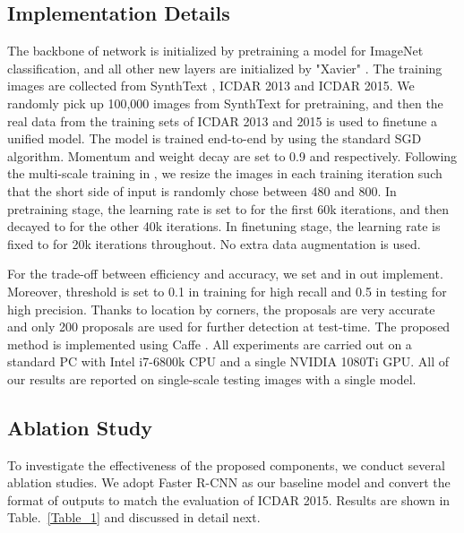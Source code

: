 \documentclass[3p, times]{elsarticle}
\begin{document}
\subsection{Implementation Details}
The backbone of network is initialized by pretraining a model for ImageNet \cite{IMAGENET2015IJCV} classification, and all other new layers are initialized by "Xavier" \cite{XAVIER2010AISTATS}. The training images are collected from SynthText \cite{FCRN2016CVPR}, ICDAR 2013 and ICDAR 2015. We randomly pick up 100,000 images from SynthText for pretraining, and then the real data from the training sets of ICDAR 2013 and 2015 is used to finetune a unified model. The model is trained end-to-end by using the standard SGD algorithm. Momentum and weight decay are set to 0.9 and   respectively. Following the multi-scale training in \cite{PVANET2016ARXIV}, we resize the images in each training iteration such that the short side of input is randomly chose between 480 and 800. In pretraining stage, the learning rate is set to  for the first 60k iterations, and then decayed to  for the other 40k iterations. In finetuning stage, the learning rate is fixed to  for 20k iterations throughout. No extra data augmentation is used.

For the trade-off between efficiency and accuracy, we set  and  in out implement. Moreover, threshold  is set to 0.1 in training for high recall and 0.5 in testing for high precision. Thanks to location by corners, the proposals are very accurate and only 200 proposals are used for further detection at test-time. The proposed method is implemented using Caffe \cite{CAFFE2014ACM}. All experiments are carried out on a standard PC with Intel i7-6800k CPU and a single NVIDIA 1080Ti GPU. All of our results are reported on single-scale testing images with a single model.



\subsection{Ablation Study}
To investigate the effectiveness of the proposed components, we conduct several ablation studies. We adopt Faster R-CNN \cite{FASTERRCNN2015NIPS} as our baseline model and convert the format of outputs to match the evaluation of ICDAR 2015. Results are shown in Table.~\ref{Table_1} and discussed in detail next. 
\end{document}
